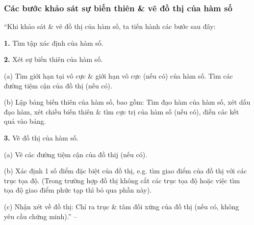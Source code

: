 \documentclass{article}
\numberwithin{equation}{section}
\begin{document}
\subsubsection{Các bước khảo sát sự biến thiên \& vẽ đồ thị của hàm số}
``Khi khảo sát \& vẽ đồ thị của hàm số, ta tiến hành các bước sau đây:
\begin{enumerate*}
	\item[\textbf{1.}] Tìm tập xác định của hàm số.
	\item[\textbf{2.}] Xét sự biến thiên của hàm số.
	\begin{enumerate*}
		\item[(a)] Tìm giới hạn tại vô cực \& giới hạn vô cực (nếu có) của hàm số. Tìm các đường tiệm cận của đồ thị (nếu có).
		\item[(b)] Lập bảng biến thiên của hàm số, bao gồm: Tìm đạo hàm của hàm số, xét dấu đạo hàm, xét chiều biến thiên \& tìm cực trị của hàm số (nếu có), điền các kết quả vào bảng.
	\end{enumerate*}
	\item[\textbf{3.}] Vẽ đồ thị của hàm số.
	\begin{enumerate*}
		\item[(a)] Vẽ các đường tiệm cận của đồ thij (nếu có).
		\item[(b)] Xác định 1 số điểm đặc biệt của đồ thị, e.g. tìm giao điểm của đồ thị với các trục tọa độ. (Trong trường hợp đồ thị không cắt các trục tọa độ hoặc việc tìm tọa độ giao điểm phức tạp thì bỏ qua phần này).
		\item[(c)] Nhận xét về đồ thị: Chỉ ra trục \& tâm đối xứng của đồ thị (nếu có, không yêu cầu chứng minh).'' -- \cite[p. 37]{SGK_Toan_12_giai_tich_nang_cao}
	\end{enumerate*}
\end{enumerate*}
\end{document}
